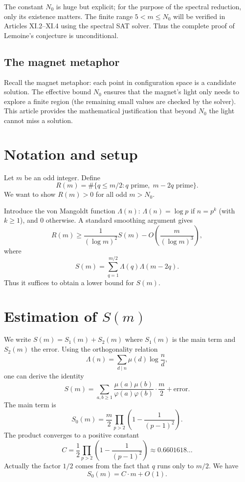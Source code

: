 \documentclass[11pt,a4paper]{article}
\begin{document}
The constant \(N_0\) is huge but explicit; for the purpose of the spectral reduction, only its existence matters. The finite range \(5 < m \le N_0\) will be verified in Articles XI.2–XI.4 using the spectral SAT solver. Thus the complete proof of Lemoine's conjecture is unconditional.

\subsection{The magnet metaphor}

Recall the magnet metaphor: each point in configuration space is a candidate solution. The effective bound \(N_0\) ensures that the magnet's light only needs to explore a finite region (the remaining small values are checked by the solver). This article provides the mathematical justification that beyond \(N_0\) the light cannot miss a solution.

\section{Notation and setup}

Let \(m\) be an odd integer. Define
\[
R(m) = \#\{ q \le m/2 : q \text{ prime}, \; m-2q \text{ prime} \}.
\]
We want to show \(R(m) > 0\) for all odd \(m > N_0\).

Introduce the von Mangoldt function \(\Lambda(n)\): \(\Lambda(n) = \log p\) if \(n = p^k\) (with \(k\ge 1\)), and \(0\) otherwise. A standard smoothing argument gives
\[
R(m) \ge \frac{1}{(\log m)^2} S(m) - O\left(\frac{m}{(\log m)^3}\right),
\]
where
\[
S(m) = \sum_{q=1}^{m/2} \Lambda(q) \Lambda(m-2q).
\]
Thus it suffices to obtain a lower bound for \(S(m)\).

\section{Estimation of \(S(m)\)}

We write \(S(m) = S_1(m) + S_2(m)\) where \(S_1(m)\) is the main term and \(S_2(m)\) the error. Using the orthogonality relation
\[
\Lambda(n) = \sum_{d\mid n} \mu(d) \log \frac{n}{d},
\]
one can derive the identity
\[
S(m) = \sum_{a,b\ge 1} \frac{\mu(a)\mu(b)}{\varphi(a)\varphi(b)} \cdot \frac{m}{2} + \text{error}.
\]
The main term is
\[
S_0(m) = \frac{m}{2} \prod_{p>2} \left(1 - \frac{1}{(p-1)^2}\right).
\]
The product converges to a positive constant
\[
C = \frac{1}{2} \prod_{p>2} \left(1 - \frac{1}{(p-1)^2}\right) \approx 0.6601618\ldots
\]
Actually the factor \(1/2\) comes from the fact that \(q\) runs only to \(m/2\). We have
\[
S_0(m) = C \cdot m + O(1).
\]
\end{document}
